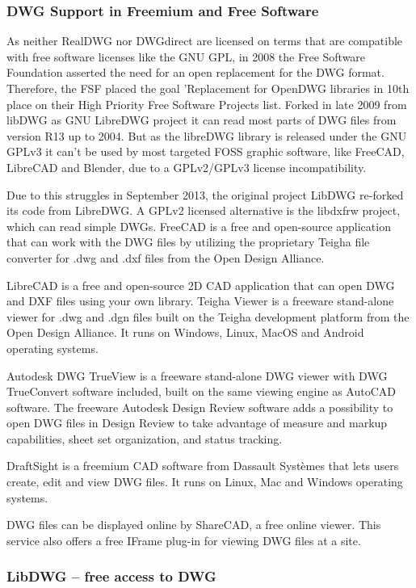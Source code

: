 \documentclass[a4paper, 11pt, article]{report}
\begin{document}
\subsubsection{DWG Support in Freemium and Free Software}

As neither RealDWG nor DWGdirect are licensed on terms that are compatible with free software licenses like the GNU GPL, in 2008 the Free Software Foundation asserted the need for an open replacement for the DWG format. Therefore, the FSF placed the goal 'Replacement for OpenDWG libraries in 10th place on their High Priority Free Software Projects list. Forked in late 2009 from libDWG as GNU LibreDWG project it can read most parts of DWG files from version R13 up to 2004. But as the libreDWG library is released under the GNU GPLv3 it can't be used by most targeted FOSS graphic software, like FreeCAD, LibreCAD and Blender, due to a GPLv2/GPLv3 license incompatibility. 

Due to this struggles in September 2013, the original project LibDWG re-forked its code from LibreDWG. A GPLv2 licensed alternative is the libdxfrw project, which can read simple DWGs. 
FreeCAD is a free and open-source application that can work with the DWG files by utilizing the proprietary Teigha file converter for .dwg and .dxf files from the Open Design Alliance. 

LibreCAD is a free and open-source 2D CAD application that can open DWG and DXF files using your own library.
Teigha Viewer is a freeware stand-alone viewer for .dwg and .dgn files built on the Teigha development platform from the Open Design Alliance. It runs on Windows, Linux, MacOS and Android operating systems.

Autodesk DWG TrueView is a freeware stand-alone DWG viewer with DWG TrueConvert software included, built on the same viewing engine as AutoCAD software. The freeware Autodesk Design Review software adds a possibility to open DWG files in Design Review to take advantage of measure and markup capabilities, sheet set organization, and status tracking.

DraftSight is a freemium CAD software from Dassault Systèmes that lets users create, edit and view DWG files. It runs on Linux, Mac and Windows operating systems. 

DWG files can be displayed online by ShareCAD, a free online viewer. This service also offers a free IFrame plug-in for viewing DWG files at a site.

\subsubsection{LibDWG – free access to DWG}
\end{document}
